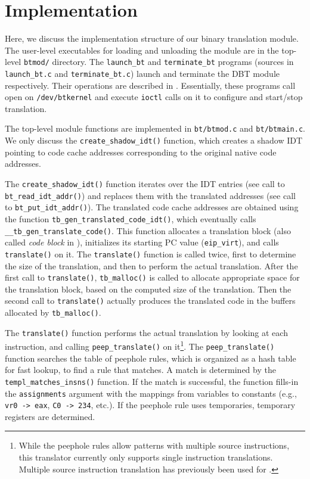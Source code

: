 \documentclass[9pt]{article}
\begin{document}
\section{Implementation}
\label{sec:implementation}
Here, we discuss the implementation structure of our binary translation
module. The user-level executables for loading and unloading the module
are in the top-level {\tt btmod/} directory. The {\tt launch\_bt} and
{\tt terminate\_bt} programs
(sources in {\tt launch\_bt.c} and {\tt terminate\_bt.c}) launch and
terminate the DBT module respectively. Their operations are described
in \cite{sosp2013}. Essentially, these programs call open
on {\tt /dev/btkernel} and execute {\tt ioctl} calls on it to
configure and start/stop translation.

The top-level module functions are implemented in {\tt bt/btmod.c}
and {\tt bt/btmain.c}. We
only discuss the {\tt create\_shadow\_idt()} function, which creates
a shadow IDT pointing to code cache addresses corresponding to the original
native code addresses.

The {\tt create\_shadow\_idt()} function iterates over the IDT entries
(see call to {\tt bt\_read\_idt\_addr()}) and replaces them with the
translated addresses (see call to {\tt bt\_put\_idt\_addr()}). The
translated code cache addresses are obtained using the function
{\tt tb\_gen\_translated\_code\_idt()}, which eventually calls
{\tt \_\_tb\_gen\_translate\_code()}. This function allocates
a translation block (also called {\em code block} in \cite{sosp13}),
initializes its starting PC value ({\tt eip\_virt}), and calls
{\tt translate()} on it.
The {\tt translate()} function is called twice, first to determine the
size of the translation, and then to perform the actual translation.
After the first call to {\tt translate()}, {\tt tb\_malloc()} is called to
allocate appropriate space for the translation block, based on the
computed size of the translation. Then the second call to {\tt translate()}
actually produces the translated code in the buffers allocated by
{\tt tb\_malloc()}.

The {\tt translate()} function performs the actual translation by
looking at each instruction, and calling {\tt peep\_translate()} on
it\footnote{While the peephole rules allow patterns with multiple
source instructions, this translator currently only supports
single instruction translations. Multiple source instruction translation
has previously been used for \cite{asplos06, osdi08}.}. The
{\tt peep\_translate()} function searches the table of peephole rules, which
is organized as a hash table for fast lookup, to find a rule that
matches. A match is determined by the {\tt templ\_matches\_insns()} function.
If the match is successful, the function fills-in the {\tt assignments}
argument with the mappings from variables to
constants (e.g., {\tt vr0 -> eax}, {\tt C0 -> 234}, etc.). If the
peephole rule uses temporaries, temporary registers are determined.
\end{document}
